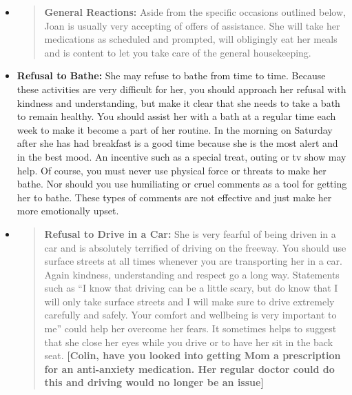 \documentclass[]{article}
\begin{document}
\begin{itemize}
\item
  \begin{quote}
  \textbf{General Reactions:} Aside from the specific occasions outlined
  below, Joan is usually very accepting of offers of assistance. She
  will take her medications as scheduled and prompted, will obligingly
  eat her meals and is content to let you take care of the general
  housekeeping.
  \end{quote}
\end{itemize}

\begin{itemize}
\item
  \textbf{Refusal to Bathe:} She may refuse to bathe from time to time.
  Because these activities are very difficult for her, you should
  approach her refusal with kindness and understanding, but make it
  clear that she needs to take a bath to remain healthy. You should
  assist her with a bath at a regular time each week to make it become a
  part of her routine. In the morning on Saturday after she has had
  breakfast is a good time because she is the most alert and in the best
  mood. An incentive such as a special treat, outing or tv show may
  help. Of course, you must never use physical force or threats to make
  her bathe. Nor should you use humiliating or cruel comments as a tool
  for getting her to bathe. These types of comments are not effective
  and just make her more emotionally upset.
\end{itemize}

\begin{itemize}
\item
  \begin{quote}
  \textbf{Refusal to Drive in a Car:} She is very fearful of being
  driven in a car and is absolutely terrified of driving on the freeway.
  You should use surface streets at all times whenever you are
  transporting her in a car. Again kindness, understanding and respect
  go a long way. Statements such as ``I know that driving can be a
  little scary, but do know that I will only take surface streets and I
  will make sure to drive extremely carefully and safely. Your comfort
  and wellbeing is very important to me'' could help her overcome her
  fears. It sometimes helps to suggest that she close her eyes while you
  drive or to have her sit in the back seat. \textbf{{[}Colin, have you
  looked into getting Mom a prescription for an anti-anxiety medication.
  Her regular doctor could do this and driving would no longer be an
  issue{]}}
  \end{quote}
\end{itemize}
\end{document}
